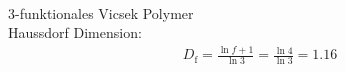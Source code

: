\documentclass[final]{beamer}
\newlength{\columnheight}
\newlength{\marginw}
\newlength{\tw}
\newlength{\colw}
\newenvironment{myTwoColPoster}{%
  \begin{minipage}[t]{\textwidth}%
    \hspace*{\marginw}%
    \hspace*{9.5bp}%
    \begin{minipage}[t]{\tw}}%
  {\end{minipage}%
   \hspace*{\marginw}%
   \end{minipage}}
\newenvironment{myCol}%
    {\begin{minipage}[t][\columnheight][t]{\colw}}%
    {\end{minipage}}
\begin{document}
\begin{frame}[t]{}
\begin{myTwoColPoster}
\begin{myCol}
  \begin{minipage}[c]{0.48\textwidth}
    {
      \\
        3-funktionales Vicsek Polymer\\
        Haussdorf Dimension:
        \begin{align*}
          D_\text{f}=\frac{\ln{f+1}}{\ln{3}} = \frac{\ln{4}}{\ln{3}} = 1.16
        \end{align*}
    }
  \end{minipage}
  \hfill
  \begin{minipage}[c]{0.48\textwidth}
    {
      }
\end{minipage}
\end{myCol}
\end{myTwoColPoster}
\end{frame}
\end{document}
